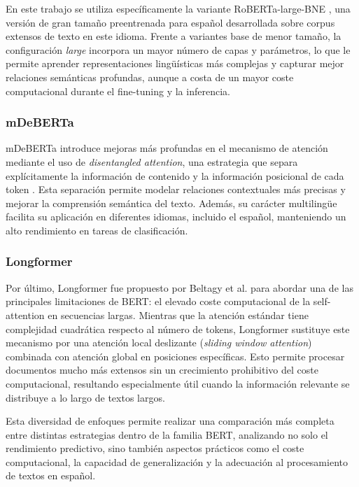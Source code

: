 En este trabajo se utiliza específicamente la variante RoBERTa-large-BNE \cite{gutierrez-fandino_maria_2022}, una versión de gran tamaño preentrenada para español desarrollada sobre corpus extensos de texto en este idioma. Frente a variantes base de menor tamaño, la configuración \textit{large} incorpora un mayor número de capas y parámetros, lo que le permite aprender representaciones lingüísticas más complejas y capturar mejor relaciones semánticas profundas, aunque a costa de un mayor coste computacional durante el fine-tuning y la inferencia.

\subsubsection{mDeBERTa}

\ac{mDeBERTa} introduce mejoras más profundas en el mecanismo de atención mediante el uso de \textit{disentangled attention}, una estrategia que separa explícitamente la información de contenido y la información posicional de cada token \cite{he_deberta_2021}. Esta separación permite modelar relaciones contextuales más precisas y mejorar la comprensión semántica del texto. Además, su carácter multilingüe facilita su aplicación en diferentes idiomas, incluido el español, manteniendo un alto rendimiento en tareas de clasificación.

\subsubsection{Longformer}

Por último, Longformer fue propuesto por Beltagy et al. \cite{beltagy_longformer_2020} para abordar una de las principales limitaciones de \ac{BERT}: el elevado coste computacional de la self-attention en secuencias largas. Mientras que la atención estándar tiene complejidad cuadrática respecto al número de tokens, Longformer sustituye este mecanismo por una atención local deslizante (\textit{sliding window attention}) combinada con atención global en posiciones específicas. Esto permite procesar documentos mucho más extensos sin un crecimiento prohibitivo del coste computacional, resultando especialmente útil cuando la información relevante se distribuye a lo largo de textos largos.

Esta diversidad de enfoques permite realizar una comparación más completa entre distintas estrategias dentro de la familia \ac{BERT}, analizando no solo el rendimiento predictivo, sino también aspectos prácticos como el coste computacional, la capacidad de generalización y la adecuación al procesamiento de textos en español.


